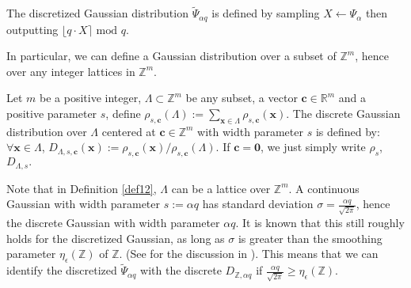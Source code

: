 \documentclass[runningheads,10pt]{llncs}
\begin{document}
	
	
	\begin{definition}  \label{def11}
	 The discretized Gaussian distribution $\widetilde{\Psi}_{\alpha q}$ is defined by sampling $X \leftarrow \Psi_{\alpha}$ then outputting $\lfloor q \cdot X\rceil \text{ mod } q$. 
	\end{definition}
	In particular, we can define a Gaussian distribution over a subset of $\mathbb{Z}^m$, hence over any integer lattices in  $\mathbb{Z}^m$. 
	\begin{definition} \label{def12}
		Let $m$ be a positive integer,  $\Lambda \subset \mathbb{Z}^m$ be any subset,  a vector $\mathbf{c}\in \mathbb{R}^m$ and a positive parameter $s$, define   $\rho_{s, \mathbf{c}}(\Lambda ):=\sum_{\mathbf{x} \in \Lambda } \rho_{s, \mathbf{c}}(\mathbf{x})$. The discrete Gaussian distribution over $\Lambda$ centered at $\mathbf{c} \in \mathbb{Z}^m$ with width parameter $s$ is defined by:
		$\forall \mathbf{x}\in \Lambda$, $D_{\Lambda,  s, \mathbf{c}}(\mathbf{x}):=\rho_{s,\mathbf{c}}(\mathbf{x})/\rho_{s,\mathbf{c}}(\Lambda).$ If $\mathbf{c}=\mathbf{0}$, we just simply write  $\rho_{s}$, $D_{\Lambda,s}.$
	\end{definition}
	Note that in Definition \ref{def12}, $\Lambda$ can be a lattice over $\mathbb{Z}^m$. A continuous Gaussian with width parameter $s:=\alpha q$ has standard deviation $\sigma=\frac{\alpha q} {\sqrt{2 \pi}}$, hence the discrete Gaussian with width parameter $\alpha q$. It is known that this still roughly holds for the discretized Gaussian, as long as
	$\sigma$ is greater than the smoothing parameter $\eta_{\epsilon}(\mathbb{Z})$ of $\mathbb{Z}$. (See for the discussion in \cite[page 170]{APS15}). This means that we  can identify the discretized $\widetilde{\Psi}_{\alpha q}$ with the discrete $D_{\mathbb{Z},\alpha q}$ if $\frac{\alpha q} {\sqrt{2 \pi}} \geq \eta_{\epsilon}(\mathbb{Z})$.\\

\fi	
	
\end{document}
